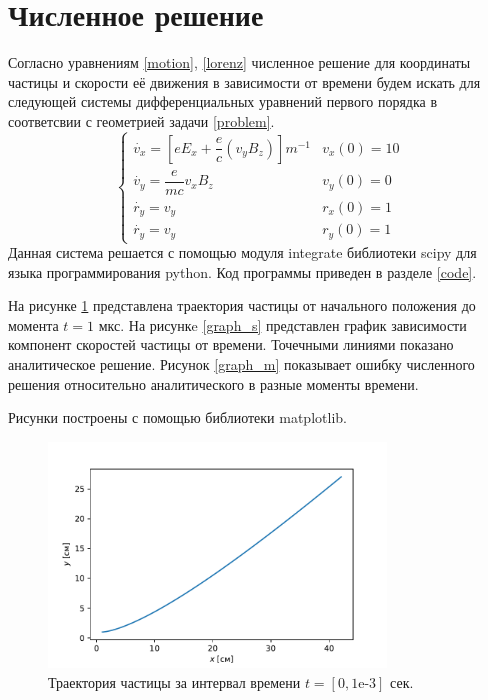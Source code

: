 \documentclass[a4paper]{article}
\begin{document}
\section{Численное решение}
Согласно уравнениям \eqref{motion}, \eqref{lorenz} численное решение для координаты частицы и скорости её движения в зависимости от времени будем искать для следующей системы дифференциальных уравнений первого порядка в соответсвии с геометрией задачи \ref{problem}.
\begin{equation}
	\begin{cases}
		\dot{v_x} = \left[eE_x + \dfrac{e}{c}\left(v_yB_z\right)\right]m^{-1}	
											& 	v_x(0) = 10 \\[10pt]
		\dot{v_y} = \dfrac{e}{mc} v_x B_z	&	v_y(0) = 0 \\[10pt]
		\dot{r_y} = v_y						&	r_x(0) = 1 \\[10pt]
		\dot{r_y} = v_y						&	r_y(0) = 1 
	\end{cases}
\end{equation}
Данная система решается с помощью модуля integrate библиотеки scipy для языка программирования python. Код программы приведен в разделе \ref{code}. 

На рисунке \ref{graph_t} представлена траектория частицы от начального положения до момента $t = 1$ мкс. На рисункe \ref{graph_s} представлен график зависимости компонент скоростей частицы от времени. Точечными линиями показано аналитическое решение.  Рисунок \ref{graph_m} показывает ошибку численного решения относительно аналитического в разные моменты времени.

Рисунки построены с помощью библиотеки matplotlib.
\begin{figure}
	\centering
	\includegraphics[width=0.8\textwidth]{plotTrajectory.pdf}
	\caption{Траектория частицы за интервал времени $t = [0, 1\text{e-}3]$ сек.}
	\label{graph_t}
\end{figure}
\end{document}

